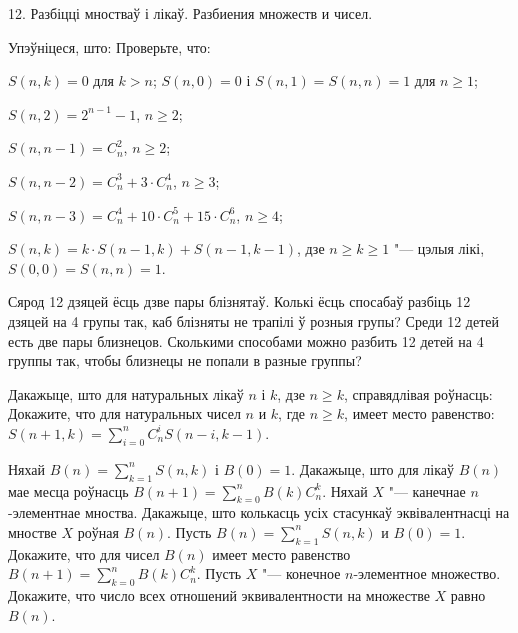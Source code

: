 



\biLangHeader
{12. Разбіцці мностваў і лікаў.}
{Разбиения множеств и чисел.}

\begin{problemList}

\problemItemWithCommonPart
{Упэўніцеся, што:}
{Проверьте, что:}
{\begin{belarusianEnumerate}
  \item $S(n, k) = 0$ для $k > n$; $S(n, 0) = 0$ і $S(n, 1) = S(n, n) = 1$ для $n \ge 1$;
  \item $S(n, 2) = 2^{n - 1} - 1$, $n \ge 2$;
  \item $S(n, n - 1) = C_n^2$, $n \ge 2$;
  \item $S(n, n - 2) = C_n^3 + 3 \cdot C_n^4$, $n \ge 3$;
  \item $S(n, n - 3) = C_n^4 + 10 \cdot C_n^5 + 15 \cdot C_n^6$, $n \ge 4$;
  \item $S(n, k) = k \cdot S(n - 1, k) + S(n - 1, k - 1)$, дзе $n \ge k \ge 1$ "--- цэлыя лікі,
  $S(0, 0) = S(n, n) = 1$.
\end{belarusianEnumerate}}

\bigskip

\problemItemSimple
{Сярод 12 дзяцей ёсць дзве пары блізнятаў. Колькі ёсць спосабаў разбіць 12 дзяцей
на 4 групы так, каб блізняты не трапілі ў розныя групы?}
{Среди 12 детей есть две пары близнецов. Сколькими способами можно разбить
12 детей на 4 группы так, чтобы близнецы не попали в разные группы?}

\bigskip

\problemItemWithCommonPart
{Дакажыце, што для натуральных лікаў $n$ і $k$, дзе $n \ge k$,
справядлівая роўнасць:}
{Докажите, что для натуральных чисел $n$ и $k$, где $n \ge k$,
имеет место равенство:}
{$S(n + 1, k) = \sum\limits_{i = 0}^n C_n^i S(n - i, k - 1)$.}

\bigskip

\problemItemSimple
{Няхай $B(n) = \sum\limits_{k = 1}^n S(n, k)$ і $B(0) = 1$. Дакажыце,
што для лікаў $B(n)$ мае месца роўнасць $B(n + 1) = \sum\limits_{k = 0}^n B(k)C_n^k$.
Няхай $X$ "--- канечнае $n$-элементнае мноства. Дакажыце, што колькасць усіх
стасункаў эквівалентнасці на мностве $X$ роўная $B(n)$.}
{Пусть $B(n) = \sum\limits_{k = 1}^n S(n, k)$ и $B(0) = 1$. Докажите,
что для чисел $B(n)$ имеет место равенство $B(n + 1) = \sum\limits_{k = 0}^n B(k)C_n^k$.
Пусть $X$ "--- конечное $n$-элементное множество. Докажите, что число всех
отношений эквивалентности на множестве $X$ равно $B(n)$.}


\end{problemList}
